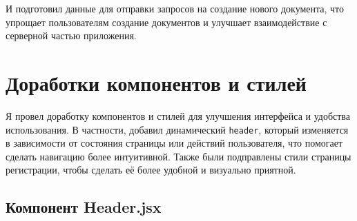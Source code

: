 \documentclass[a4paper,12pt]{article}
\begin{document}
И подготовил данные для отправки запросов на создание нового документа, что упрощает пользователям создание документов и улучшает взаимодействие с серверной частью приложения.

\section*{Доработки компонентов и стилей}
Я провел доработку компонентов и стилей для улучшения интерфейса и удобства использования. В частности, добавил динамический \texttt{header}, который изменяется в зависимости от состояния страницы или действий пользователя, что помогает сделать навигацию более интуитивной. Также были подправлены стили страницы регистрации, чтобы сделать её более удобной и визуально приятной.

\subsection*{Компонент Header.jsx}
\end{document}
